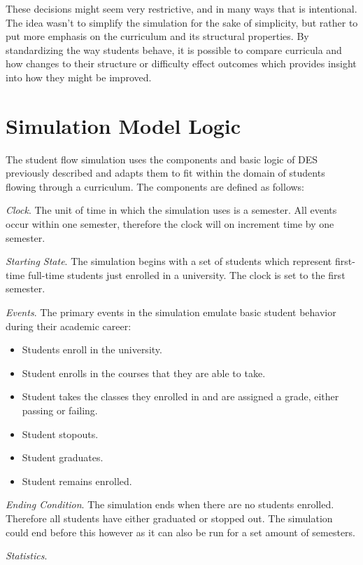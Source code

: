 \documentclass[botnum, fleqn]{unmeethesis}
\begin{document}
These decisions might seem very restrictive, and in many ways that is intentional. The idea wasn't to simplify the simulation for the sake of simplicity, but rather to put more emphasis on the curriculum and its structural properties. By standardizing the way students behave, it is possible to compare curricula and how changes to their structure or difficulty effect outcomes which provides insight into how they might be improved.

\section{Simulation Model Logic}
The student flow simulation uses the components and basic logic of DES previously described and adapts them to fit within the domain of students flowing through a curriculum. The components are defined as follows:

\textit{Clock}. The unit of time in which the simulation uses is a semester. All events occur within one semester, therefore the clock will on increment time by one semester.

\textit{Starting State}. The simulation begins with a set of students which represent first-time full-time students just enrolled in a university. The clock is set to the first semester.

\textit{Events}. The primary events in the simulation emulate basic student behavior during their academic career:
\begin{itemize}
  \item Students enroll in the university.
  \item Student enrolls in the courses that they are able to take.
  \item Student takes the classes they enrolled in and are assigned a grade, either passing or failing.
  \item Student stopouts.
  \item Student graduates.
  \item Student remains enrolled.
\end{itemize}

\textit{Ending Condition}. The simulation ends when there are no students enrolled. Therefore all students have either graduated or stopped out. The simulation could end before this however as it can also be run for a set amount of semesters.

\textit{Statistics}.
\end{document}
